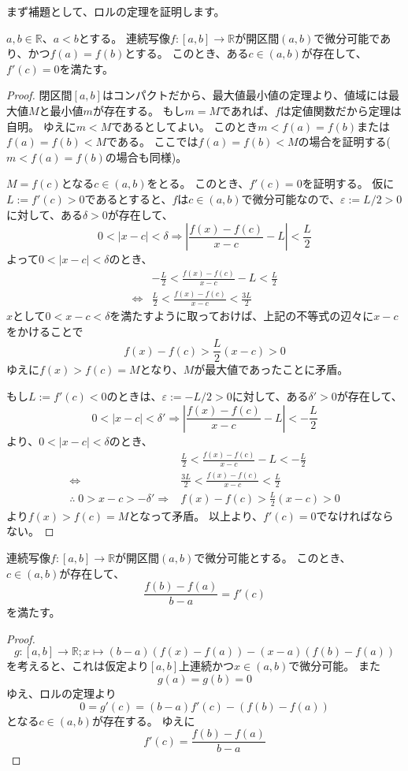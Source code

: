 まず補題として、ロルの定理を証明します。
\begin{theorem}[ロルの定理]
  $a,b\in\mathbb{R}$、$a<b$とする。
  連続写像$f:[a,b]\to\mathbb{R}$が開区間$(a,b)$で微分可能であり、かつ$f(a)=f(b)$とする。
  このとき、ある$c\in(a,b)$が存在して、$f'(c)=0$を満たす。
\end{theorem}
\begin{proof}
  閉区間$[a,b]$はコンパクトだから、最大値最小値の定理より、値域には最大値$M$と最小値$m$が存在する。
  もし$m=M$であれば、$f$は定値関数だから定理は自明。
  ゆえに$m<M$であるとしてよい。
  このとき$m<f(a)=f(b)$または$f(a)=f(b)<M$である。
  ここでは$f(a)=f(b)<M$の場合を証明する($m<f(a)=f(b)$の場合も同様)。

  $M=f(c)$となる$c\in(a,b)$をとる。
  このとき、$f'(c)=0$を証明する。
  仮に$L:=f'(c)>0$であるとすると、$f$は$c\in(a,b)$で微分可能なので、$\varepsilon:=L/2>0$に対して、ある$\delta>0$が存在して、
  \[
    0<|x-c|<\delta\Rightarrow\left|\frac{f(x)-f(c)}{x-c}-L\right|<\frac{L}{2}
  \]
  よって$0<|x-c|<\delta$のとき、
  \begin{align*}
    &-\frac{L}{2}<\frac{f(x)-f(c)}{x-c}-L<\frac{L}{2}\\
    \iff&\frac{L}{2}<\frac{f(x)-f(c)}{x-c}<\frac{3L}{2}
  \end{align*}
  $x$として$0<x-c<\delta$を満たすように取っておけば、上記の不等式の辺々に$x-c$をかけることで
  \[
    f(x)-f(c)>\frac{L}{2}(x-c)>0
  \]
  ゆえに$f(x)>f(c)=M$となり、$M$が最大値であったことに矛盾。

  もし$L:=f'(c)<0$のときは、$\varepsilon:=-L/2>0$に対して、ある$\delta'>0$が存在して、
  \[
    0<|x-c|<\delta'\Rightarrow\left|\frac{f(x)-f(c)}{x-c}-L\right|<-\frac{L}{2}
  \]
  より、$0<|x-c|<\delta$のとき、
  \begin{align*}
    &\frac{L}{2}<\frac{f(x)-f(c)}{x-c}-L<-\frac{L}{2}\\
    \iff&\frac{3L}{2}<\frac{f(x)-f(c)}{x-c}<\frac{L}{2}\\
    \therefore\;0>x-c>-\delta'\Rightarrow& f(x)-f(c)>\frac{L}{2}(x-c)>0
  \end{align*}
  より$f(x)>f(c)=M$となって矛盾。
  以上より、$f'(c)=0$でなければならない。
\end{proof}

\begin{theorem}[平均値の定理]
  連続写像$f:[a,b]\to\mathbb{R}$が開区間$(a,b)$で微分可能とする。
  このとき、$c\in(a,b)$が存在して、
  \[
    \frac{f(b)-f(a)}{b-a}=f'(c)
  \]
  を満たす。
\end{theorem}
\begin{proof}
  \[
    g:[a,b]\to\mathbb{R};x\mapsto (b-a)(f(x)-f(a))-(x-a)(f(b)-f(a))
  \]
  を考えると、これは仮定より$[a,b]$上連続かつ$x\in(a,b)$で微分可能。
  また
  \[
    g(a)=g(b)=0
  \]
  ゆえ、ロルの定理より
  \[
    0=g'(c)=(b-a)f'(c)-(f(b)-f(a))
  \]
  となる$c\in(a,b)$が存在する。
  ゆえに
  \[
    f'(c)=\frac{f(b)-f(a)}{b-a}
  \]
\end{proof}

